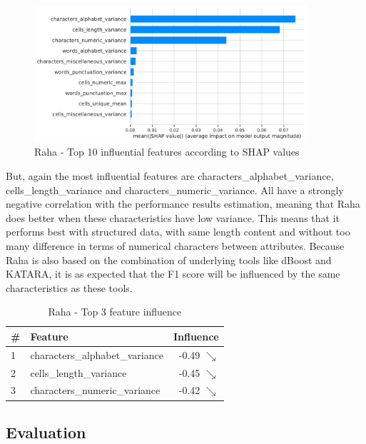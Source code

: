\begin{figure}[H]
    \centering
    \includegraphics[width=0.9\textwidth]{thesis/Figures/RQ4/Shap_Raha.pdf}
    \caption{Raha - Top 10 influential features according to SHAP values}
    \label{fig:most_impact_features_raha}
\end{figure}

But, again the most influential features are characters\_alphabet\_variance, cells\_length\_variance and characters\_numeric\_variance. All have a strongly negative correlation with the performance results estimation, meaning that Raha does better when these characteristics have low variance. This means that it performs best with structured data, with same length content and without too many difference in terms of numerical characters between attributes. Because Raha is also based on the combination of underlying tools like dBoost and KATARA, it is as expected that the F1 score will be influenced by the same characteristics as these tools.

\begin{table}[H]
\centering
\begin{tabular}{llr}
\toprule
 \# &                         Feature &         Influence \\
\midrule
 1 &  characters\_alphabet\_variance &  -0.49 $\searrow$ \\
 2 &         cells\_length\_variance &  -0.45 $\searrow$ \\
 3 &   characters\_numeric\_variance &  -0.42 $\searrow$ \\
\bottomrule
\end{tabular}
\caption{Raha - Top 3 feature influence}
\label{tab:top_influence_features_raha}
\end{table}

\subsection{Evaluation}